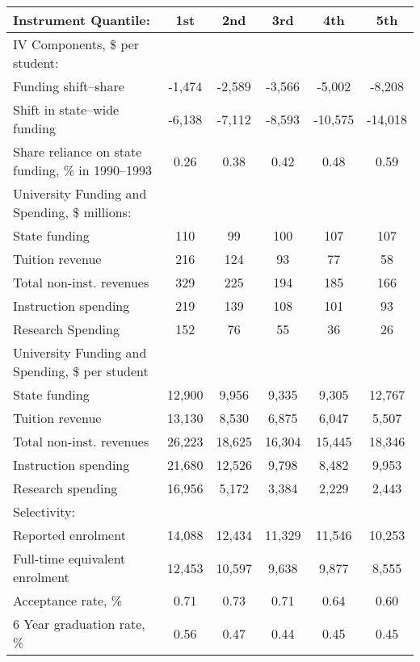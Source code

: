 \begin{tabular}{lccccc}
  \hline
Instrument Quantile: & 1st & 2nd & 3rd & 4th & 5th \\ 
  \hline
IV Components, \$ per student: &  &  &  &  &  \\ 
  Funding shift--share & -1,474 & -2,589 & -3,566 & -5,002 & -8,208 \\ 
  Shift in state--wide funding & -6,138 & -7,112 & -8,593 & -10,575 & -14,018 \\ 
  Share reliance on state funding, \% in 1990--1993 & 0.26 & 0.38 & 0.42 & 0.48 & 0.59 \\ 
  \hline University Funding and Spending, \$ millions: &  &  &  &  &  \\ 
  State funding & 110 & 99 & 100 & 107 & 107 \\ 
  Tuition revenue & 216 & 124 & 93 & 77 & 58 \\
  Total non-inst. revenues & 329 & 225 & 194 & 185 & 166 \\ 
  Instruction spending & 219 & 139 & 108 & 101 & 93 \\ 
  Research Spending & 152 & 76 & 55 & 36 & 26 \\ 
  \hline University Funding and Spending, \$ per student &  &  &  &  &  \\ 
  State funding & 12,900 & 9,956 & 9,335 & 9,305 & 12,767 \\ 
  Tuition revenue & 13,130 & 8,530 & 6,875 & 6,047 & 5,507 \\ 
  Total non-inst. revenues & 26,223 & 18,625 & 16,304 & 15,445 & 18,346 \\ 
  Instruction spending & 21,680 & 12,526 & 9,798 & 8,482 & 9,953 \\ 
  Research spending & 16,956 & 5,172 & 3,384 & 2,229 & 2,443 \\ 
  \hline Selectivity: &  &  &  &  &  \\ 
  Reported enrolment & 14,088 & 12,434 & 11,329 & 11,546 & 10,253 \\ 
  Full-time equivalent enrolment & 12,453 & 10,597 & 9,638 & 9,877 & 8,555 \\ 
  Acceptance rate, \% & 0.71 & 0.73 & 0.71 & 0.64 & 0.60 \\ 
  6 Year graduation rate, \% & 0.56 & 0.47 & 0.44 & 0.45 & 0.45 \\ 
   \hline
\end{tabular}
